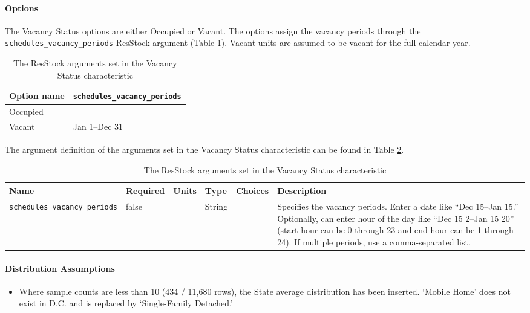 \paragraph{Options}
The Vacancy Status options are either Occupied or Vacant. The options assign the vacancy periods through the  \texttt{schedules\_vacancy\_periods} ResStock argument (Table \ref{table:hc_opt_vacancy}). Vacant units are assumed to be vacant for the full calendar year.

\begin{longtable}[]{|p{3.5cm}|p{5cm}|}\caption{The ResStock arguments set in the Vacancy Status characteristic} \label{table:hc_opt_vacancy}  \\
\toprule\noalign{}
Option name & \texttt{schedules\_vacancy\_periods} \\
\midrule\noalign{}
\endhead
\bottomrule\noalign{}
\endlastfoot
Occupied & \\
Vacant & Jan 1--Dec 31 \\
\end{longtable}

The argument definition of the arguments set in the Vacancy Status characteristic can be found in Table \ref{table:hc_arg_def_vacancy}.

\begin{longtable}[]{|p{}|p{1.5cm}|p{1.3cm}|p{1.1cm}|p{}|p{}|} \caption{The ResStock arguments set in the Vacancy Status characteristic} \label{table:hc_arg_def_vacancy}  \\
\toprule\noalign{}
Name & Required & Units & Type & Choices & Description \\
\midrule\noalign{}
\endhead
\bottomrule\noalign{}
\endlastfoot
\texttt{schedules\_vacancy\_periods} & false & & String & & Specifies
the vacancy periods. Enter a date like ``Dec 15--Jan 15.'' Optionally,
can enter hour of the day like ``Dec 15 2--Jan 15 20'' (start hour can be
0 through 23 and end hour can be 1 through 24). If multiple periods, use
a comma-separated list. \\
\end{longtable}

\paragraph{Distribution Assumptions}
\begin{itemize}
\item
  Where sample counts are less than 10 (434 / 11,680 rows), the State
  average distribution has been inserted. `Mobile
  Home' does not exist in D.C. and is replaced by
  `Single-Family Detached.'
\end{itemize}

